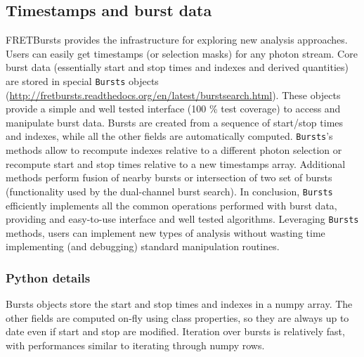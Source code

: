 \subsection{Timestamps and burst data}
\label{sec:burststimes}

FRETBursts provides the infrastructure for exploring new analysis approaches.
Users can easily get timestamps (or selection masks) for any photon stream.
Core burst data (essentially start and stop times and indexes 
and derived quantities) are stored in special \verb|Bursts| objects 
(\href{documentation}{http://fretbursts.readthedocs.org/en/latest/burstsearch.html}).
These objects provide a simple and well tested interface (100 \% test coverage) 
to access and manipulate burst data. Bursts are created from a sequence of start/stop 
times and indexes, while all the other fields are automatically
computed. \verb|Bursts|'s methods allow to recompute indexes relative to a different photon
selection or recompute start and stop times relative to a new timestamps array.
Additional methods perform fusion of nearby bursts or intersection of two set
of bursts (functionality used by the dual-channel burst search).
In conclusion, \verb|Bursts| efficiently implements all the common operations performed 
with burst data, providing and easy-to-use interface and well tested algorithms. 
Leveraging \verb|Bursts| methods, users can implement new types of analysis without 
wasting time implementing (and debugging) standard manipulation routines.

\subsubsection{Python details}
Bursts objects store the start and stop times and indexes in a numpy array.
The other fields are computed on-fly using class properties, so they are always
up to date even if start and stop are modified. Iteration over bursts is
relatively fast, with performances similar to iterating through numpy rows.

